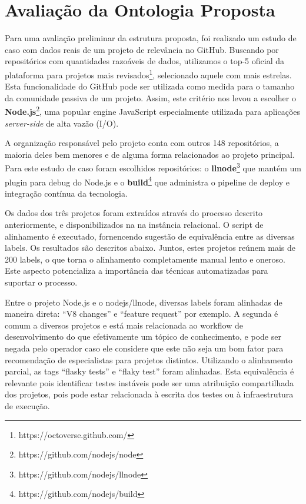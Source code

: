 \documentclass[sigconf]{acmart}
\begin{document}
\section{Avaliação da Ontologia Proposta}

Para uma avaliação preliminar da estrutura proposta, foi realizado um estudo de caso com dados reais de um projeto de relevância no GitHub. Buscando por repositórios com quantidades razoáveis de dados, utilizamos o top-5 oficial da plataforma para projetos mais revisados\footnote{https://octoverse.github.com/}, selecionado aquele com mais estrelas. Esta funcionalidade do GitHub pode ser utilizada como medida para o tamanho da comunidade passiva de um projeto\cite{sheoran2014}. Assim, este critério nos levou a escolher o \textbf{Node.js}\footnote{https://github.com/nodejs/node}, uma popular engine JavaScript especialmente utilizada para aplicações \textit{server-side} de alta vazão (I/O).

A organização responsável pelo projeto conta com outros 148 repositórios, a maioria deles bem menores e de alguma forma relacionados ao projeto principal. Para este estudo de caso foram escolhidos repositórios: o \textbf{llnode}\footnote{https://github.com/nodejs/llnode} que mantém um plugin para debug do Node.js e o \textbf{build}\footnote{https://github.com/nodejs/build} que administra o pipeline de deploy e integração contínua da tecnologia.

Os dados dos três projetos foram extraídos através do processo descrito anteriormente, e disponibilizados na na instância relacional. O script de alinhamento é executado, fornencendo sugestão de equivalência entre as diversas labels. Os resultados são descritos abaixo. Juntos, estes projetos reúnem mais de 200 labels, o que torna o alinhamento completamente manual lento e oneroso. Este aspecto potencializa a importância das técnicas automatizadas para suportar o processo.

Entre o projeto Node.js e o nodejs/llnode, diversas labels foram alinhadas de maneira direta: ``V8 changes'' e ``feature request'' por exemplo. A segunda é comum a diversos projetos e está mais relacionada ao workflow de desenvolvimento do que efetivamente um tópico de conhecimento, e pode ser negada pelo operador caso ele considere que este não seja um bom fator para recomendação de especialistas para projetos distintos. Utilizando o alinhamento parcial, as tags ``flasky tests'' e ``flaky test'' foram alinhadas. Esta equivalência é relevante pois identificar testes instáveis pode ser uma atribuição compartilhada dos projetos, pois pode estar relacionada à escrita dos testes ou à infraestrutura de execução.
\end{document}
